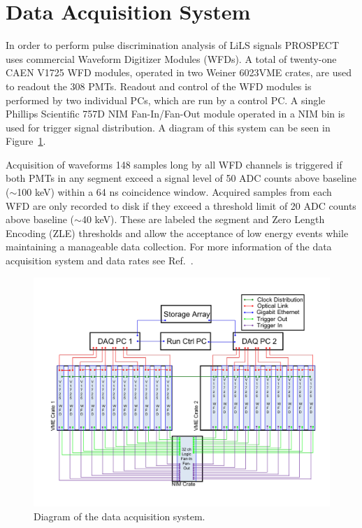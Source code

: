 \section{Data Acquisition System} \label{sec:DAQ}

In order to perform pulse discrimination analysis of LiLS signals PROSPECT uses commercial Waveform Digitizer Modules (WFDs).
A total of twenty-one CAEN V1725 WFD modules, operated in two Weiner 6023VME crates, are used to readout the 308 PMTs. 
Readout and control of the WFD modules is performed by two individual PCs, which are run by a control PC. 
A single Phillips Scientific 757D NIM Fan-In/Fan-Out module operated in a NIM bin is used for trigger signal distribution.
A diagram of this system can be seen in Figure~\ref{fig:daq}.

Acquisition of waveforms 148 samples long by all WFD channels is triggered if both PMTs in any segment exceed a signal level of 50 ADC counts above baseline ($\sim$100 keV) within a 64 ns coincidence window.  
Acquired samples from each WFD are only recorded to disk if they exceed a threshold limit of 20 ADC counts above baseline ($\sim$40 keV). 
These are labeled the segment and Zero Length Encoding (ZLE) thresholds and allow the acceptance of low energy events while maintaining a manageable data collection. 
For more information of the data acquisition system and data rates see Ref.~\cite{LongNIM}.

\begin{figure}[h]
	\centering
	\includegraphics[width=0.7\linewidth]{tex/4-prospect-images/DAQ}
	\caption[DAQ schematic]{Diagram of the data acquisition system.}
	\label{fig:daq}
\end{figure}


